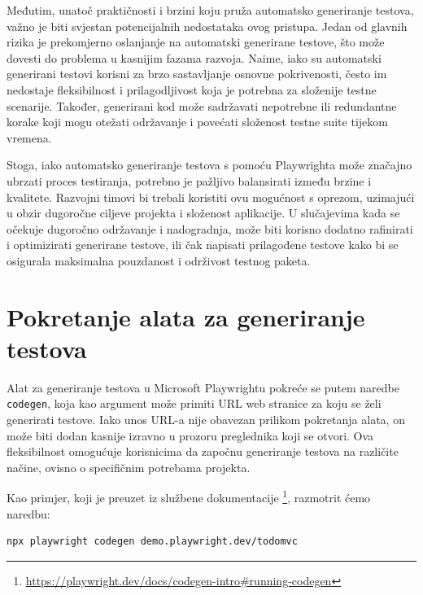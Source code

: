 Međutim, unatoč praktičnosti i brzini koju pruža automatsko generiranje testova, važno je biti svjestan potencijalnih nedostataka ovog pristupa.
Jedan od glavnih rizika je prekomjerno oslanjanje na automatski generirane testove, što može dovesti do problema u kasnijim fazama razvoja.
Naime, iako su automatski generirani testovi korisni za brzo sastavljanje osnovne pokrivenosti, često im nedostaje fleksibilnost i prilagodljivost koja je potrebna za složenije testne scenarije.
Također, generirani kod može sadržavati nepotrebne ili redundantne korake koji mogu otežati održavanje i povećati složenost testne suite tijekom vremena.

Stoga, iako automatsko generiranje testova s pomoću Playwrighta može značajno ubrzati proces testiranja, potrebno je pažljivo balansirati između brzine i kvalitete.
Razvojni timovi bi trebali koristiti ovu mogućnost s oprezom, uzimajući u obzir dugoročne ciljeve projekta i složenost aplikacije.
U slučajevima kada se očekuje dugoročno održavanje i nadogradnja, može biti korisno dodatno rafinirati i optimizirati generirane testove, ili čak napisati prilagođene testove kako bi se osigurala maksimalna pouzdanost i održivost testnog paketa.

\section{Pokretanje alata za generiranje testova}

Alat za generiranje testova u Microsoft Playwrightu pokreće se putem naredbe \texttt{codegen}, koja kao argument može primiti URL web stranice za koju se želi generirati testove.
Iako unos URL-a nije obavezan prilikom pokretanja alata, on može biti dodan kasnije izravno u prozoru preglednika koji se otvori.
Ova fleksibilnost omogućuje korisnicima da započnu generiranje testova na različite načine, ovisno o specifičnim potrebama projekta.

Kao primjer, koji je preuzet iz službene dokumentacije \footnote{\url{https://playwright.dev/docs/codegen-intro\#running-codegen}}, razmotrit ćemo naredbu:
\begin{verbatim}
npx playwright codegen demo.playwright.dev/todomvc
\end{verbatim}

